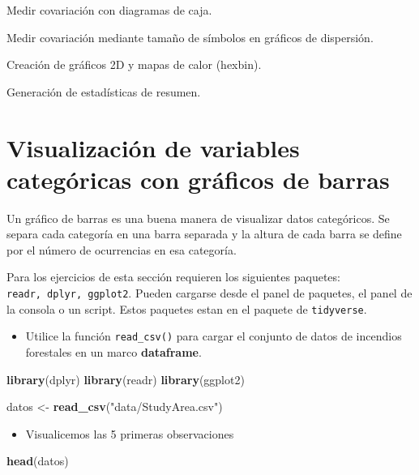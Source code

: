 \documentclass[
]{book}
\newenvironment{Shaded}{\begin{snugshade}}{\end{snugshade}}
\newcommand{\FunctionTok}[1]{\textcolor[rgb]{0.13,0.29,0.53}{\textbf{#1}}}
\newcommand{\NormalTok}[1]{#1}
\newcommand{\OtherTok}[1]{\textcolor[rgb]{0.56,0.35,0.01}{#1}}
\newcommand{\StringTok}[1]{\textcolor[rgb]{0.31,0.60,0.02}{#1}}
\providecommand{\tightlist}{%
  \setlength{\itemsep}{0pt}\setlength{\parskip}{0pt}}
\begin{document}
Medir covariación con diagramas de caja.

Medir covariación mediante tamaño de símbolos en gráficos de dispersión.

Creación de gráficos 2D y mapas de calor (hexbin).

Generación de estadísticas de resumen.

\section{Visualización de variables categóricas con gráficos de barras}\label{visualizaciuxf3n-de-variables-categuxf3ricas-con-gruxe1ficos-de-barras}

Un gráfico de barras es una buena manera de visualizar datos categóricos. Se separa cada categoría en una barra separada y la altura de cada barra se define por el número de ocurrencias en esa categoría.

Para los ejercicios de esta sección requieren los siguientes paquetes: \texttt{readr,\ dplyr,\ ggplot2}. Pueden cargarse desde el panel de paquetes, el panel de la consola o un script. Estos paquetes estan en el paquete de \texttt{tidyverse}.

\begin{itemize}
\tightlist
\item
  Utilice la función \texttt{read\_csv()} para cargar el conjunto de datos de incendios forestales en un marco \textbf{dataframe}.
\end{itemize}

\begin{Shaded}
\begin{Highlighting}[]
\FunctionTok{library}\NormalTok{(dplyr)}
\FunctionTok{library}\NormalTok{(readr)}
\FunctionTok{library}\NormalTok{(ggplot2)}

\NormalTok{datos }\OtherTok{\textless{}{-}} \FunctionTok{read\_csv}\NormalTok{(}\StringTok{"data/StudyArea.csv"}\NormalTok{)}
\end{Highlighting}
\end{Shaded}

\begin{itemize}
\tightlist
\item
  Visualicemos las 5 primeras observaciones
\end{itemize}

\begin{Shaded}
\begin{Highlighting}[]
\FunctionTok{head}\NormalTok{(datos)}
\end{Highlighting}
\end{Shaded}
\end{document}
